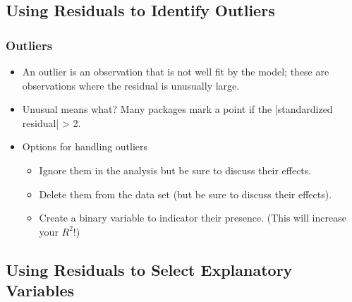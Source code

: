 \subsection{Using Residuals to Identify Outliers}


\begin{frame}%
 \frametitle{Outliers}
 \begin{itemize}
   \item  An outlier is an observation that is not well fit by the model; these
are observations where the residual is unusually large.
 \item Unusual means what?  Many packages mark a point if the |standardized residual| > 2.
  \item Options for handling outliers
 \begin{itemize}
   \item  Ignore them in the analysis but be sure to discuss their
effects.
\item  Delete them from the data set (but be sure to discuss their
effects).
\item  Create a binary variable to indicator their presence. (This
will increase your $R^2$!)
    \end{itemize}
    \end{itemize}
\end{frame}

\subsection{Using Residuals to Select Explanatory
Variables}

